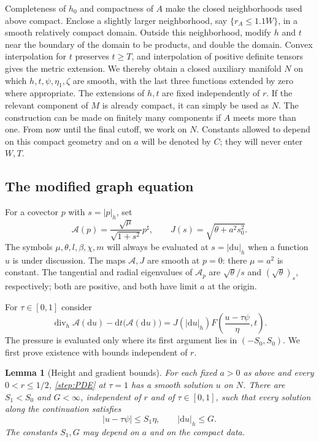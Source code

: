 \documentclass[11pt]{article}
\numberwithin{equation}{section}
\newtheorem{lemma}[theorem]{Lemma}
\theoremstyle{definition}
\theoremstyle{remark}
\begin{document}
Completeness of $h_0$ and compactness of $A$ make the closed neighborhoods
used above compact.  Enclose a slightly larger neighborhood, say
$\{r_A\le1.1W\}$, in a smooth relatively compact domain.  Outside this
neighborhood, modify $h$ and $t$ near the boundary of the domain to be
products, and double the domain.  Convex interpolation for $t$ preserves
$t\ge T$, and interpolation of positive definite tensors gives the
metric extension.  We thereby obtain a closed auxiliary manifold $N$
on which $h,t,\psi,\eta_1,\zeta$ are smooth, with the last three functions
extended by zero where appropriate.  The extensions of $h,t$ are fixed
independently of $r$.  If the relevant component of $M$ is already compact,
it can simply be used as $N$.  The construction can be made on finitely
many components if $A$ meets more than one.  From now until the final
cutoff, we work on $N$.  Constants allowed to depend on this compact
geometry and on $a$ will be denoted by $C$; they will never enter $W,T$.

\subsection{The modified graph equation}

For a covector $p$ with $s=|p|_h$, set
\[
 \mathcal A(p)=\frac{\sqrt\mu}{\sqrt{1+s^2}}p^\sharp,
 \qquad J(s)=\sqrt{\theta+a^2s_0^2}.
\]
The symbols $\mu,\theta,l,\beta,\chi,m$ will always be evaluated at
$s=|\mathrm d u|_h$ when a function $u$ is under discussion.  The maps
$\mathcal A,J$ are smooth at $p=0$: there $\mu=a^2$ is constant.
The tangential and radial eigenvalues of $\mathcal A_p$ are
$\sqrt\theta/s$ and $(\sqrt\theta)_s$, respectively; both are positive,
and both have limit $a$ at the origin.

For $\tau\in[0,1]$ consider
\begin{equation}\label{step:PDE}
 \operatorname{div}_h\mathcal A(\mathrm d u)-\mathrm d t\bigl(\mathcal A(\mathrm d u)\bigr)
 =J(|\mathrm d u|_h)F\left(\frac{u-\tau\psi}{\eta},t\right).
\end{equation}
The pressure is evaluated only where its first argument lies in
$(-S_0,S_0)$.  We first prove existence with bounds independent of $r$.

\begin{lemma}[Height and gradient bounds]\label{step:existence}
For each fixed $a>0$ as above and every $0<r\le1/2$,
\cref{step:PDE} at $\tau=1$ has a smooth solution $u$ on $N$.
There are $S_1<S_0$ and $G<\infty$, independent of $r$ and of
$\tau\in[0,1]$, such that every solution along the continuation satisfies
\begin{equation}\label{step:C01}
 |u-\tau\psi|\le S_1\eta,\qquad |\mathrm d u|_h\le G.
\end{equation}
The constants $S_1,G$ may depend on $a$ and on the compact data.
\end{lemma}
\end{document}
